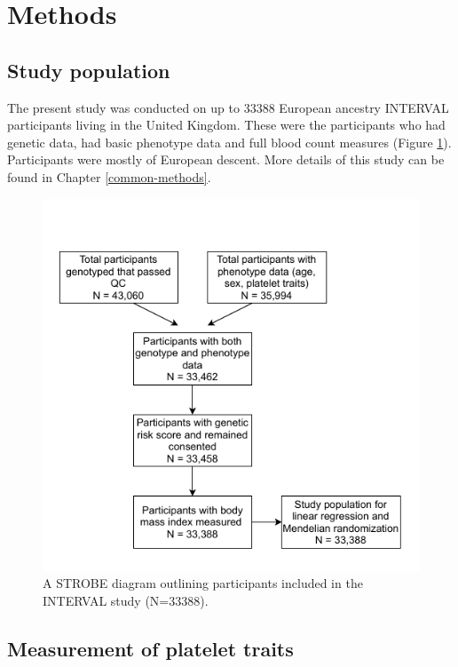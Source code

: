 \documentclass[11pt,twoside]{bristolthesis}
\begin{document}
\hypertarget{methods}{%
\section{Methods}\label{methods}}

\hypertarget{study-population}{%
\subsection{Study population}\label{study-population}}

The present study was conducted on up to 33388 European ancestry INTERVAL participants living in the United Kingdom. These were the participants who had genetic data, had basic phenotype data and full blood count measures (Figure \ref{fig:INTERVAL-STROBE}). Participants were mostly of European descent. More details of this study can be found in Chapter \ref{common-methods}.
\begin{figure}
\includegraphics[width=0.8\linewidth]{figure/BMI_platelets/STROBE_diagram} \caption{A STROBE diagram outlining participants included in the INTERVAL study (N=33388).}\label{fig:INTERVAL-STROBE}
\end{figure}
\hypertarget{measurement-of-platelet-traits}{%
\subsection{Measurement of platelet traits}\label{measurement-of-platelet-traits}}
\end{document}
